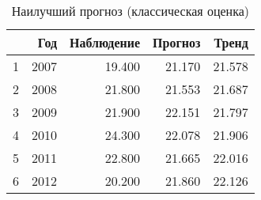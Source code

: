 \begin{table}[ht]
\centering
\begin{tabular}{rrrrr}
  \hline
 & Год & Наблюдение & Прогноз & Тренд \\ 
  \hline
1 & 2007 & 19.400 & 21.170 & 21.578 \\ 
  2 & 2008 & 21.800 & 21.553 & 21.687 \\ 
  3 & 2009 & 21.900 & 22.151 & 21.797 \\ 
  4 & 2010 & 24.300 & 22.078 & 21.906 \\ 
  5 & 2011 & 22.800 & 21.665 & 22.016 \\ 
  6 & 2012 & 20.200 & 21.860 & 22.126 \\ 
   \hline
\end{tabular}
\caption{Наилучший прогноз (классическая оценка)} 
\label{table:classical-best-prediction}
\end{table}
